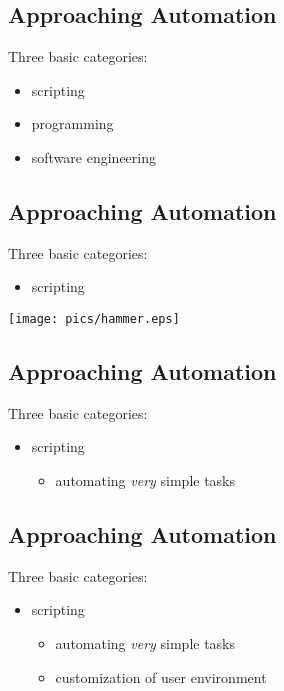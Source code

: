 \documentclass[xga]{xdvislides}
\begin{document}
\subsection{Approaching Automation}
Three basic categories:
\\

\begin{itemize}
	\item scripting
	\item programming
	\item software engineering
\end{itemize}

\subsection{Approaching Automation}
Three basic categories:
\\
\begin{itemize}
	\item scripting
\end{itemize}
\vspace*{\fill}
\begin{center}
	\texttt{[image: pics/hammer.eps]}
\end{center}
\vspace*{\fill}


\subsection{Approaching Automation}
Three basic categories:
\\

\begin{itemize}
	\item scripting
		\begin{itemize}
			\item automating {\em very} simple tasks
		\end{itemize}
\end{itemize}

\subsection{Approaching Automation}
Three basic categories:
\\

\begin{itemize}
	\item scripting
		\begin{itemize}
			\item automating {\em very} simple tasks
			\item customization of user environment
		\end{itemize}
\end{itemize}
\end{document}
